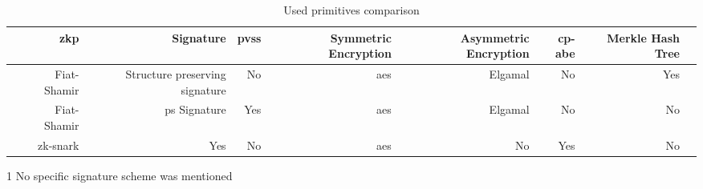 \begin{table*}[h!]\centering
\caption{Used primitives comparison}\label{tab:used-primitives-comparison}
\scriptsize
\begin{threeparttable}
\begin{tabular}{lrrrrrrrr}
\toprule %
&\ac{zkp} &Signature &\ac{pvss} &Symmetric Encryption &Asymmetric Encryption &\ac{cp-abe} &Merkle Hash Tree \\\midrule
\cite{xue2023blockchain} &Fiat-Shamir &Structure preserving signature &No &\ac{aes} &Elgamal &No &Yes \\
\cite{liu2022blockchain} &Fiat-Shamir &\ac{ps} Signature &Yes &\ac{aes} &Elgamal &No &No \\
\cite{alsharif2020blockchain} &\ac{zk-snark} &Yes\tnote{1} &No &\ac{aes} &No &Yes &No \\
\bottomrule
\end{tabular}
\begin{tablenotes}
    \item[1] No specific signature scheme was mentioned
\end{tablenotes}
\end{threeparttable}
\end{table*}

